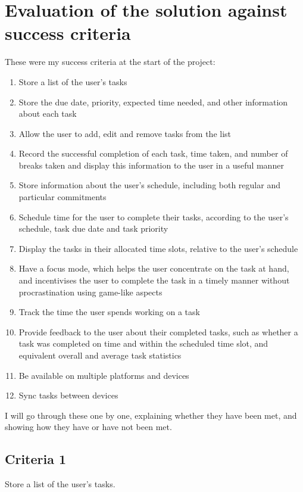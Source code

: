 \documentclass{article}
\begin{document}
\section{Evaluation of the solution against success criteria}
These were my success criteria at the start of the project:
\begin{enumerate}
	\item Store a list of the user's tasks
	\item Store the due date, priority, expected time needed, and other information
	      about each task
	\item Allow the user to add, edit and remove tasks from the list
	\item Record the successful completion of each task, time taken, and number of
	      breaks taken and display this information to the user in a useful manner
	\item Store information about the user's schedule,
	      including both regular and particular commitments
	\item Schedule time for the user to complete their tasks, according to the
	      user's schedule, task due date and task priority
	\item Display the tasks in their allocated time slots,
	      relative to the user's schedule
	\item Have a focus mode, which helps the user concentrate on the task at hand,
	      and incentivises the user to complete the task in a timely manner without
	      procrastination using game-like aspects
	\item Track the time the user spends working on a task
	\item Provide feedback to the user about their completed tasks,
	      such as whether a task was completed on time and within the scheduled time slot,
	      and equivalent overall and average task statistics
	\item Be available on multiple platforms and devices
	\item Sync tasks between devices
\end{enumerate}

I will go through these one by one,
explaining whether they have been met,
and showing how they have or have not been met.

\subsection{Criteria 1}
Store a list of the user's tasks.
\end{document}
